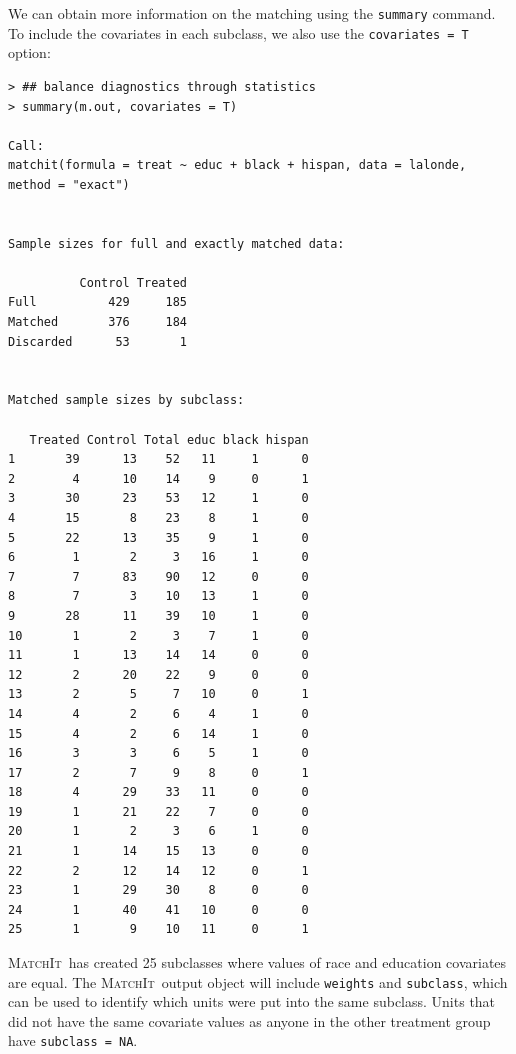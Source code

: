 \documentclass[oneside,letterpaper,titlepage]{article}
\newcommand{\MatchIt}{\textsc{MatchIt}}
\begin{document}
We can obtain more information on the matching using the {\tt summary}
command.  To include the covariates in each subclass, we also use the
\texttt{covariates = T} option:
\begin{verbatim}
> ## balance diagnostics through statistics
> summary(m.out, covariates = T)

Call:
matchit(formula = treat ~ educ + black + hispan, data = lalonde,     method = "exact")


Sample sizes for full and exactly matched data:

          Control Treated
Full          429     185
Matched       376     184
Discarded      53       1


Matched sample sizes by subclass:

   Treated Control Total educ black hispan
1       39      13    52   11     1      0
2        4      10    14    9     0      1
3       30      23    53   12     1      0
4       15       8    23    8     1      0
5       22      13    35    9     1      0
6        1       2     3   16     1      0
7        7      83    90   12     0      0
8        7       3    10   13     1      0
9       28      11    39   10     1      0
10       1       2     3    7     1      0
11       1      13    14   14     0      0
12       2      20    22    9     0      0
13       2       5     7   10     0      1
14       4       2     6    4     1      0
15       4       2     6   14     1      0
16       3       3     6    5     1      0
17       2       7     9    8     0      1
18       4      29    33   11     0      0
19       1      21    22    7     0      0
20       1       2     3    6     1      0
21       1      14    15   13     0      0
22       2      12    14   12     0      1
23       1      29    30    8     0      0
24       1      40    41   10     0      0
25       1       9    10   11     0      1
\end{verbatim}
\MatchIt\ has created 25 subclasses where values of race and education
covariates are equal.  The \MatchIt\ output object will include
\texttt{weights} and \texttt{subclass}, which can be used to identify
which units were put into the same subclass.  Units that did not have
the same covariate values as anyone in the other treatment group have
\texttt{subclass = NA}.
\end{document}
